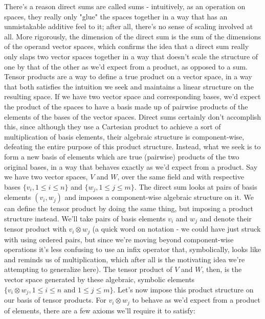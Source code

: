 \documentclass{article}
\newcommand{\nn}{\leavevmode \newline \newline}
\begin{document}
There's a reason direct sums are called sums - intuitively, as an operation on spaces, they really only "glue" the spaces together in a way that has an unmistakable additive feel to it; after all, there's no sense of scaling involved at all. More rigorously, the dimension of the direct sum is the sum of the dimensions of the operand vector spaces, which confirms the idea that a direct sum really only slaps two vector spaces together in a way that doesn't scale the structure of one by that of the other as we'd expect from a product, as opposed to a sum. Tensor products are a way to define a true product on a vector space, in a way that both satisfies the intuition we seek and maintains a linear structure on the resulting space. If we have two vector space and corresponding bases, we'd expect the product of the spaces to have a basis made up of pairwise products of the elements of the bases of the vector spaces. Direct sums certainly don't accomplish this, since although they use a Cartesian product to achieve a sort of multiplication of basis elements, their algebraic structure is component-wise, defeating the entire purpose of this product structure. Instead, what we seek is to form a new basis of elements which are true (pairwise) products of the two original bases, in a way that behaves exactly as we'd expect from a product.
\nn
Say we have two vector spaces, $ V $ and $ W $, over the same field and with respective bases $ \{ v_i, 1 \leq i \leq n \} $ and $ \{ w_j, 1 \leq j \leq m \} $. The direct sum looks at pairs of basis elements $ (v_i, w_j) $ and imposes a component-wise algebraic structure on it. We can define the tensor product by doing the same thing, but imposing a product structure instead. We'll take pairs of basis elements $ v_i $ and $ w_j $ and denote their tensor product with $ v_i \otimes w_j $ (a quick word on notation - we could have just struck with using ordered pairs, but since we're moving beyond component-wise operations it's less confusing to use an infix operator that, symbolically, looks like and reminds us of multiplication, which after all is the motivating idea we're attempting to generalize here). The tensor product of $ V $ and $ W $, then, is the vector space generated by these algebraic, symbolic elements $ \{ v_i \otimes w_j, 1 \leq i \leq n \text{ and } 1 \leq j \leq m \} $. Let's now impose this product structure on our basis of tensor products. For $ v_i \otimes w_j $ to behave as we'd expect from a product of elements, there are a few axioms we'll require it to satisfy:
\end{document}
